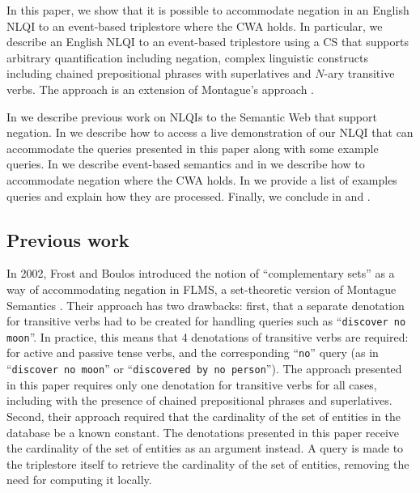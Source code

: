\documentclass[../main.tex]{subfiles}
\begin{document}
\begin{refsection}
In this paper, we show that it is possible to accommodate negation in an English NLQI to an event-based triplestore where the CWA holds.
In particular, we describe an English NLQI to an event-based triplestore using a CS that supports arbitrary quantification including negation, complex linguistic constructs including chained prepositional phrases with superlatives and $N$-ary transitive verbs.
The approach is an extension of Montague’s approach \cite{Dowty:wall}.

In  we describe previous work on NLQIs to the Semantic Web that support negation.  In  we describe how to access a live demonstration of our NLQI that can accommodate the queries presented in this paper along with some example queries.  In  we describe event-based semantics and in  we describe how to accommodate negation where the CWA holds. In  we provide a list of examples queries and explain how they are processed.  Finally, we conclude in  and .



\subsection{Previous work}
\label{subsec:prevwork}

In 2002, Frost and Boulos introduced the notion of ``complementary sets'' as a way of accommodating negation in FLMS, a set-theoretic version of Montague Semantics \cite{frostboulos2002}. Their approach has two drawbacks: first, that a separate denotation for transitive verbs had to be created for handling queries such as ``\texttt{discover no moon}''.  In practice, this means that 4 denotations of transitive verbs are required: for active and passive tense verbs, and the corresponding ``\texttt{no}'' query (as in ``\texttt{discover no moon}'' or ``\texttt{discovered by no person}'').  The approach presented in this paper requires only one denotation for transitive verbs for all cases, including with the presence of chained prepositional phrases and superlatives.  Second, their approach required that the cardinality of the set of entities in the database be a known constant.  The denotations presented in this paper receive the cardinality of the set of entities as an argument instead.  A query is made to the triplestore itself to retrieve the cardinality of the set of entities, removing the need for computing it locally.


\end{refsection}
\end{document}
